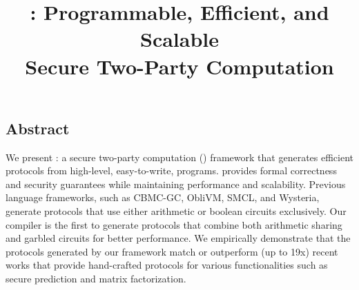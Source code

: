 \documentclass[letterpaper,twocolumn,10pt]{article}
\begin{document}
\setlength\intextsep{1pt}
\setlength{\textfloatsep}{1pt}
\setlength{\abovecaptionskip}{4pt}
\setlength{\belowcaptionskip}{4pt}

\date{}

\title{\tool: Programmable, Efficient, and Scalable \\ Secure Two-Party Computation}




\maketitle

\subsection*{Abstract}


We present \tool: a 
secure two-party computation (\mpc) framework that generates efficient
\mpc protocols from high-level, easy-to-write, programs.
\tool provides formal correctness and security guarantees while maintaining performance and scalability.
Previous language frameworks, such as CBMC-GC, ObliVM, SMCL, and
Wysteria,
generate protocols that use either arithmetic or boolean
circuits exclusively. Our compiler is the first to generate protocols
that combine both arithmetic sharing and garbled circuits  for better
performance.
We
empirically demonstrate that the
protocols generated by our framework match or outperform (up to
19x)
recent works that provide hand-crafted protocols for various
functionalities such as secure  prediction  and matrix factorization.
\end{document}
